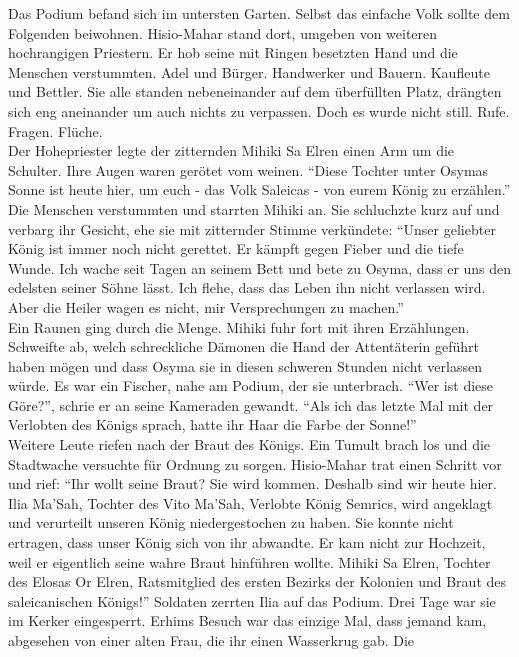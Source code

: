 Das Podium befand sich im untersten Garten. Selbst das einfache Volk sollte dem Folgenden 
beiwohnen. Hisio-Mahar stand dort, umgeben von weiteren hochrangigen Priestern. Er hob seine mit 
Ringen besetzten Hand und die Menschen verstummten. Adel und Bürger. Handwerker und Bauern. 
Kaufleute und Bettler. Sie alle standen nebeneinander auf dem überfüllten Platz, drängten sich eng 
aneinander um auch nichts zu verpassen. Doch es wurde nicht still. Rufe. Fragen. Flüche.\\
Der Hohepriester legte der zitternden Mihiki Sa Elren einen Arm um die Schulter. Ihre Augen waren 
gerötet vom weinen. ``Diese Tochter unter Osymas Sonne ist heute hier, um euch - das Volk Saleicas 
- von eurem König zu erzählen.''\\
Die Menschen verstummten und starrten Mihiki an. Sie schluchzte kurz auf und verbarg ihr Gesicht, 
ehe sie mit zitternder Stimme verkündete: ``Unser geliebter König ist immer noch nicht gerettet. 
Er kämpft gegen Fieber und die tiefe Wunde. Ich wache seit Tagen an seinem Bett und bete zu Osyma, 
dass er uns den edelsten seiner Söhne lässt. Ich flehe, dass das Leben ihn nicht verlassen wird. 
Aber die Heiler wagen es nicht, mir Versprechungen zu machen.''\\
Ein Raunen ging durch die Menge. Mihiki fuhr fort mit ihren Erzählungen. Schweifte ab, welch 
schreckliche Dämonen die Hand der Attentäterin geführt haben mögen und dass Osyma sie in diesen 
schweren Stunden nicht verlassen würde. Es war ein Fischer, nahe am Podium, der sie unterbrach. 
``Wer ist diese Göre?'', schrie er an seine Kameraden gewandt. ``Als ich das letzte Mal mit der 
Verlobten des Königs sprach, hatte ihr Haar die Farbe der Sonne!''\\
Weitere Leute riefen nach der Braut des Königs. Ein Tumult brach los und die Stadtwache versuchte 
für Ordnung zu sorgen. Hisio-Mahar trat einen Schritt vor und rief: ``Ihr wollt seine Braut? Sie 
wird kommen. Deshalb sind wir heute hier. Ilia Ma'Sah, Tochter des Vito Ma'Sah, Verlobte König 
Semrics, wird angeklagt und verurteilt unseren König niedergestochen zu haben. Sie konnte nicht 
ertragen, dass unser König sich von ihr abwandte. Er kam nicht zur Hochzeit, weil er eigentlich 
seine wahre Braut hinführen wollte. Mihiki Sa Elren, Tochter des Elosas Or Elren, Ratsmitglied des 
ersten Bezirks der Kolonien und Braut des saleicanischen Königs!''
Soldaten zerrten Ilia auf das Podium. Drei Tage war sie im Kerker eingesperrt. Erhims Besuch war 
das einzige Mal, dass jemand kam, abgesehen von einer alten Frau, die ihr einen Wasserkrug gab. Die 
